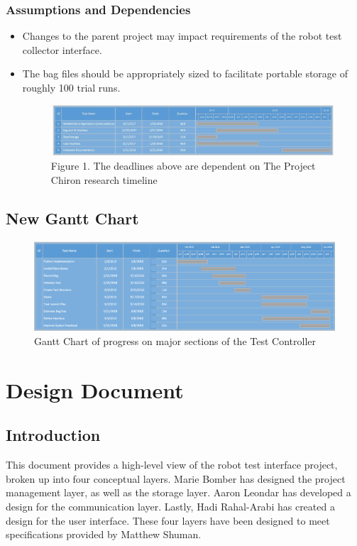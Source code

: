 \documentclass[onecolumn, draftclsnofoot,10pt, compsoc]{report}
\begin{document}
	\subsection{Assumptions and Dependencies}
	\begin{itemize}
		\item Changes to the parent project may impact requirements of the robot test collector interface.
		\item The bag files should be appropriately sized to facilitate portable storage of roughly 100 trial runs.
		\begin{figure}[h!]
			
			\centering
			\includegraphics[width=\linewidth, scale=0.7]{PrelimGanttChart.jpg}
			Figure 1. The deadlines above are dependent on The Project Chiron research timeline
		\end{figure}
		
	\end{itemize}
	
\section{New Gantt Chart}

\begin{figure}[h]
	\centering
	\includegraphics[width=0.7\linewidth]{"Revised Gantt"}
	\caption{Gantt Chart of progress on major sections of the Test Controller}
	\label{fig:revised-gantt}
\end{figure}


\chapter{Design Document}
\minitoc

\section{Introduction}
This document provides a high-level view of the robot test interface project, broken up into four conceptual layers. Marie Bomber has designed the project management layer, as well as the storage layer. Aaron Leondar has developed a design for the communication layer. Lastly, Hadi Rahal-Arabi has created a design for the user interface. These four layers have been designed to meet specifications provided by Matthew Shuman.
\end{document}
